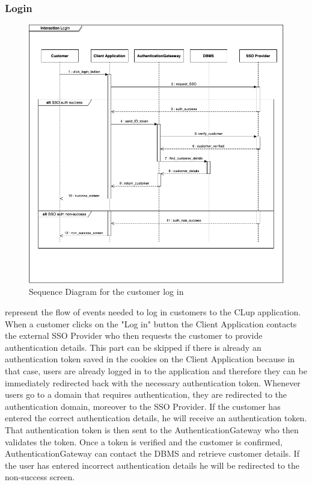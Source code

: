 \subsubsection{Login}
\begin{figure}[H]
    \centering
    \includegraphics[height=0.4\textwidth]{Images/SequenceDiagrams/Login.png}
    \caption{Sequence Diagram for the customer log in}
    \label{fig:SDLogin}
\end{figure}
 represent the flow of events needed to log in customers to the CLup application.
When a customer clicks on the "Log in" button the Client Application contacts the external SSO Provider who then requests the customer to provide authentication details.
This part can be skipped if there is already an authentication token saved in the cookies on the Client Application because in that case, users are already logged in to the application and therefore they can be immediately redirected back with the necessary authentication token.
Whenever users go to a domain that requires authentication, they are redirected to the authentication domain, moreover to the SSO Provider.
If the customer has entered the correct authentication details, he will receive an authentication token. That authentication token is then sent to the AuthenticationGateway who then validates the token.
Once a token is verified and the customer is confirmed, AuthenticationGateway can contact the DBMS and retrieve customer details.
If the user has entered incorrect authentication details he will be redirected to the non-success screen.

